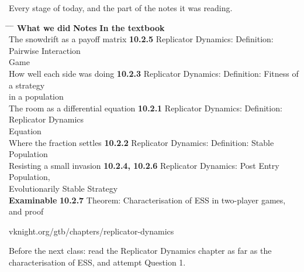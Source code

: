 \newpage
\nonotes
{}

\vspace{0.3cm}

{\large Every stage of today, and the part of the notes it was reading.}

\vspace{0.35cm}

\hspace{0.3cm}
\begin{minipage}{0.95\linewidth}
\begin{tabbing}
\hspace{6.9cm} \= \hspace{3.0cm} \= \hspace{9.4cm} \= \kill
\textbf{What we did} \> {\color{inkteal}\textbf{Notes}} \> \textbf{In the textbook} \>
  \\[0.5em]
The snowdrift as a payoff matrix \> {\color{inkteal}\textbf{10.2.5}} \> Replicator
  Dynamics: Definition: Pairwise Interaction \> \\
\> \> Game \> \\[0.45em]
How well each side was doing \> {\color{inkteal}\textbf{10.2.3}} \> Replicator
  Dynamics: Definition: Fitness of a strategy \> \\
\> \> in a population \> \\[0.45em]
The room as a differential equation \> {\color{inkteal}\textbf{10.2.1}} \> Replicator
  Dynamics: Definition: Replicator Dynamics \> \\
\> \> Equation \> \\[0.45em]
Where the fraction settles \> {\color{inkteal}\textbf{10.2.2}} \> Replicator Dynamics:
  Definition: Stable Population \> \\[0.45em]
Resisting a small invasion \> {\color{inkteal}\textbf{10.2.4, 10.2.6}} \> Replicator
  Dynamics: Post Entry Population, \> \\
\> \> Evolutionarily Stable Strategy \> \\[0.45em]
\textbf{Examinable} \> {\color{inkteal}\textbf{10.2.7}} \> Theorem: Characterisation
  of ESS in two-player games, \> \\
\> \> and proof \> 
\end{tabbing}
\end{minipage}

\vspace{0.45cm}

{\color{inkgrey} vknight.org/gtb/chapters/replicator-dynamics}

\vspace{0.3cm}

{\large Before the next class: read the Replicator Dynamics chapter as far as the
  characterisation of ESS, and attempt Question 1.}


